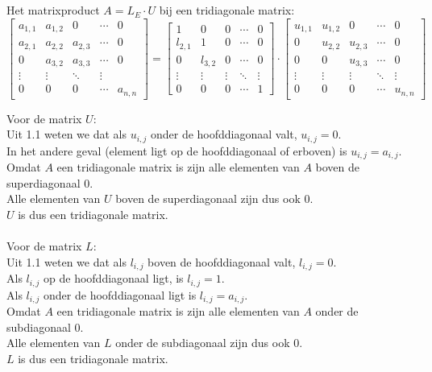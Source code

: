 \documentclass[a4paper]{article}
\begin{document}
\\{}
\\Het matrixproduct  $A=L_{E}\cdot U$ bij een tridiagonale matrix:
\[
 \begin{bmatrix}
  a_{1,1} & a_{1,2}& 0 & \cdots &0 \\
  a_{2,1} & a_{2,2}&a_{2,3} & \cdots &0 \\
 0 & a_{3,2}&a_{3,3} & \cdots &0 \\
  \vdots  & \vdots  & \ddots & \vdots  \\
 0 & 0 &0 & \cdots & a_{n,n} 
 \end{bmatrix}
=
\begin{bmatrix}
 1 & 0 & 0& \cdots & 0 \\
  l_{2,1} &1 &0& \cdots &0 \\
0 &l_{3,2} &0& \cdots &0 \\
    \vdots  &\vdots  & \vdots  & \ddots & \vdots  \\
0 &0&0 & \cdots & 1 
\end{bmatrix}
\cdot
\begin{bmatrix}
  u_{1,1} & u_{1,2}&0& \cdots &0 \\
  0 & u_{2,2}&u_{2,3} & \cdots &0 \\
  0 & 0&u_{3,3} & \cdots &0 \\
   \vdots  & \vdots  & \vdots  & \ddots & \vdots  \\
 0 & 0 &0& \cdots & u_{n,n}
\end{bmatrix}
\]



Voor de matrix $U$:
\\Uit 1.1 weten we dat als $u_{i,j}$ onder de hoofddiagonaal valt, $u_{i,j} = 0$.
\\In het andere geval (element ligt op de hoofddiagonaal of erboven) is $u_{i,j} = a_{i,j}$.
\\Omdat $A$ een tridiagonale matrix is zijn alle elementen van $A$ boven de superdiagonaal $0$.
\\Alle elementen van $U$ boven de superdiagonaal zijn dus ook 0.
\\$U$ is dus een tridiagonale matrix.
\\{}
\\Voor de matrix $L$:
\\Uit 1.1 weten we dat als $l_{i,j}$ boven de hoofddiagonaal valt, $l_{i,j} = 0$.
\\Als $l_{i,j}$ op de hoofddiagonaal ligt, is $l_{i,j} = 1$.
\\Als $l_{i,j}$ onder de hoofddiagonaal ligt is $l_{i,j} = a_{i,j}$.
\\Omdat $A$ een tridiagonale matrix is zijn alle elementen van $A$ onder de subdiagonaal $0$.
\\Alle elementen van $L$ onder de subdiagonaal zijn dus ook 0.
\\$L$ is dus een tridiagonale matrix.
%
%
%
%
%
%
\end{document}
